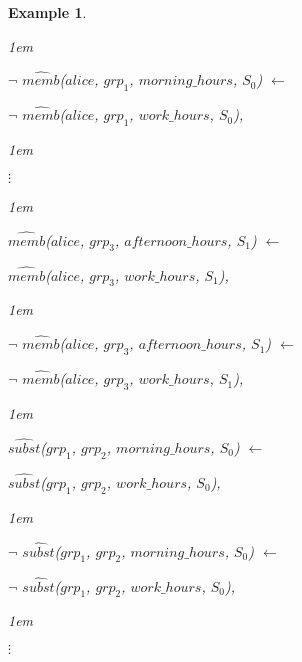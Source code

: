 \documentclass[11pt]{report}
\newtheorem{vexample}{Example}[chapter]
\newenvironment{vquote}
{
  \begin{list}{}{\leftmargin 1em}\item[]
}
{
  \end{list}
}
\begin{document}
\begin{vexample}
\begin{enumerate}
              \begin{vquote}
                $\lnot$ $\hat{memb}$($alice$, $grp_1$, $morning\_hours$, $S_0$) $\leftarrow$

                \hspace{1em}
                $\lnot$ $\hat{memb}$($alice$, $grp_1$, $work\_hours$, $S_0$),
              \end{vquote}

              \begin{vquote}
                \hspace{1em}
                $\vdots$
              \end{vquote}

              \begin{vquote}
                $\hat{memb}$($alice$, $grp_3$, $afternoon\_hours$, $S_1$) $\leftarrow$

                \hspace{1em}
                $\hat{memb}$($alice$, $grp_3$, $work\_hours$, $S_1$),
              \end{vquote}

              \begin{vquote}
                $\lnot$ $\hat{memb}$($alice$, $grp_3$, $afternoon\_hours$, $S_1$) $\leftarrow$

                \hspace{1em}
                $\lnot$ $\hat{memb}$($alice$, $grp_3$, $work\_hours$, $S_1$),
              \end{vquote}

              \begin{vquote}
                $\hat{subst}$($grp_1$, $grp_2$, $morning\_hours$, $S_0$) $\leftarrow$

                \hspace{1em}
                $\hat{subst}$($grp_1$, $grp_2$, $work\_hours$, $S_0$),
              \end{vquote}

              \begin{vquote}
                $\lnot$ $\hat{subst}$($grp_1$, $grp_2$, $morning\_hours$, $S_0$) $\leftarrow$

                \hspace{1em}
                $\lnot$ $\hat{subst}$($grp_1$, $grp_2$, $work\_hours$, $S_0$),
              \end{vquote}

              \begin{vquote}
                \hspace{1em}
                $\vdots$
              \end{vquote}


\end{enumerate}
\end{vexample}
\end{document}

